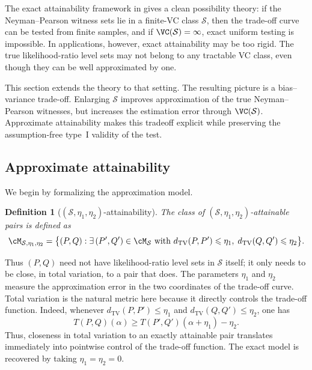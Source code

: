 \documentclass[english]{article}
\theoremstyle{plain}
\newtheorem{definition}{Definition}[section]
\theoremstyle{definition}
\newcommand{\Toff}[2]{T(#1,#2)}
\newcommand{\dTV}{d_{\mathrm{TV}}}                 %
\begin{document}
The exact attainability framework in  gives a clean
possibility theory: if the Neyman--Pearson witness sets lie in a finite-VC
class \(\mathcal S\), then the trade-off curve can be tested from finite
samples, and if \(\VC(\mathcal S)=\infty\), exact uniform testing is impossible.
In applications, however, exact attainability may be too rigid. The true
likelihood-ratio level sets may not belong to any tractable VC class, even
though they can be well approximated by one.

This section extends the theory to that setting. The resulting picture is a
bias--variance trade-off. Enlarging \(\mathcal S\) improves approximation of the
true Neyman--Pearson witnesses, but increases the estimation error through
\(\VC(\mathcal S)\). Approximate attainability makes this tradeoff explicit
while preserving the assumption-free type~I validity of the test.




\subsection{Approximate attainability}

We begin by formalizing the approximation model.

\begin{definition}[$(\mathcal S, \eta_1, \eta_2)$-attainability]\label{def:approx-attain}
The class of $(\mathcal S, \eta_1, \eta_2)$-attainable pairs is defined as
\[
\cM_{\mathcal S, \eta_1, \eta_2}
=
\big\{(P,Q) : \exists\, (P', Q') \in \cM_{\mathcal S}
\text{ with }
\dTV(P, P') \leqslant \eta_1,\;
\dTV(Q, Q') \leqslant \eta_2\big\}.
\]
\end{definition}
Thus \((P,Q)\) need not have likelihood-ratio level sets in \(\mathcal S\)
itself; it only needs to be close, in total variation, to a pair that does.
The parameters \(\eta_1\) and \(\eta_2\) measure the approximation error in the
two coordinates of the trade-off curve.
Total variation is the natural metric here because it directly
controls the trade-off function. Indeed, whenever
\(\dTV(P,P')\leqslant \eta_1\) and \(\dTV(Q,Q')\leqslant \eta_2\), one has
\[
\Toff{P}{Q}(\alpha)\geqslant \Toff{P'}{Q'}(\alpha+\eta_1)-\eta_2.
\]
Thus, closeness in total variation to an exactly attainable pair translates
immediately into pointwise control of the trade-off function. The exact model
is recovered by taking \(\eta_1=\eta_2=0\).
\end{document}
